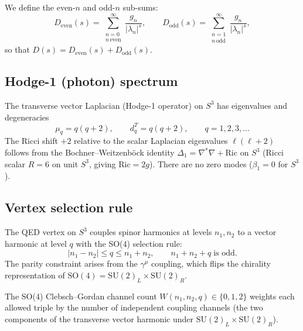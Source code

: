 \documentclass[11pt]{article}
\begin{document}
We define the even-$n$ and odd-$n$ sub-sums:
\begin{equation}
  D_{\mathrm{even}}(s) = \sum_{\substack{n=0 \\ n\,\mathrm{even}}}^{\infty}
    \frac{g_n}{|\lambda_n|^s}, \qquad
  D_{\mathrm{odd}}(s) = \sum_{\substack{n=1 \\ n\,\mathrm{odd}}}^{\infty}
    \frac{g_n}{|\lambda_n|^s},
  \label{eq:D_even_odd_def}
\end{equation}
so that $D(s) = D_{\mathrm{even}}(s) + D_{\mathrm{odd}}(s)$.

\subsection{Hodge-1 (photon) spectrum}

The transverse vector Laplacian (Hodge-1 operator) on $S^3$ has
eigenvalues and degeneracies
\begin{equation}
  \mu_q = q(q+2), \qquad d_q^T = q(q+2), \qquad q = 1, 2, 3, \ldots
  \label{eq:hodge1_spectrum}
\end{equation}
The Ricci shift $+2$ relative to the scalar Laplacian eigenvalues
$\ell(\ell+2)$ follows from the Bochner--Weitzenb\"ock identity
$\Delta_1 = \nabla^*\nabla + \mathrm{Ric}$ on $S^3$
(Ricci scalar $R = 6$ on unit $S^3$, giving $\mathrm{Ric} = 2g$).
There are no zero modes ($\beta_1 = 0$ for $S^3$).

\subsection{Vertex selection rule}

The QED vertex on $S^3$ couples spinor harmonics at levels $n_1, n_2$
to a vector harmonic at level $q$ with the SO(4) selection rule:
\begin{equation}
  |n_1 - n_2| \le q \le n_1 + n_2, \qquad
  n_1 + n_2 + q \;\text{is odd}.
  \label{eq:vertex_rule}
\end{equation}
The parity constraint arises from the $\gamma^\mu$ coupling, which
flips the chirality representation of $\mathrm{SO}(4)
= \mathrm{SU}(2)_L \times \mathrm{SU}(2)_R$.

The SO(4) Clebsch--Gordan channel count $W(n_1, n_2, q) \in \{0,1,2\}$
weights each allowed triple by the number of independent coupling
channels (the two components of the transverse vector harmonic under
$\mathrm{SU}(2)_L \times \mathrm{SU}(2)_R$).

\end{document}
